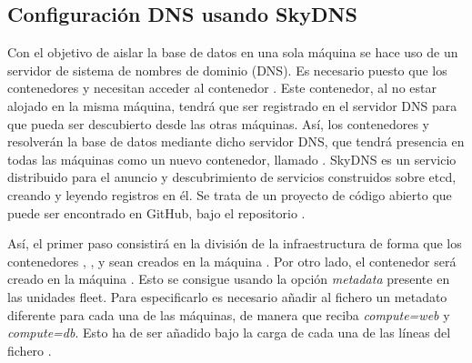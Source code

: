 \subsection{Configuración DNS usando SkyDNS}

Con el objetivo de aislar la base de datos en una sola máquina se hace uso de un servidor de sistema de nombres de dominio (DNS). Es necesario puesto que los contenedores  y  necesitan acceder al contenedor . Este contenedor, al no estar alojado en la misma máquina, tendrá que ser registrado en el servidor DNS para que pueda ser descubierto desde las otras máquinas. Así, los contenedores  y  resolverán la base de datos mediante dicho servidor DNS, que tendrá presencia en todas las máquinas como un nuevo contenedor, llamado . SkyDNS es un servicio distribuido para el anuncio y descubrimiento de servicios construidos sobre etcd, creando y leyendo registros en él. Se trata de un proyecto de código abierto que puede ser encontrado en GitHub, bajo el repositorio .

Así, el primer paso consistirá en la división de la infraestructura de forma que los contenedores , ,  y  sean creados en la máquina . Por otro lado, el contenedor  será creado en la máquina . Esto se consigue usando la opción \textit{metadata} presente en las unidades fleet. Para especificarlo es necesario añadir al fichero  un metadato diferente para cada una de las máquinas, de manera que  reciba \textit{compute=web} y  \textit{compute=db}. Esto ha de ser añadido bajo la carga de cada una de las líneas del fichero .


